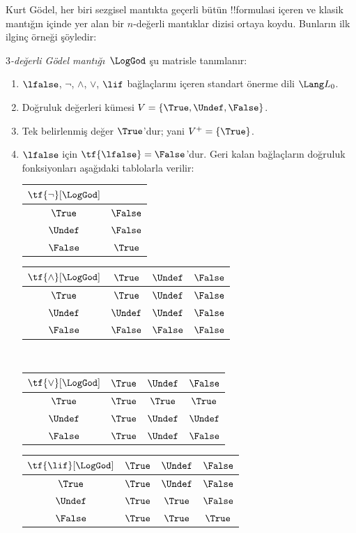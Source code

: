 



Kurt G\"odel, her biri sezgisel mantıkta geçerli bütün !!{formula}s{}i
içeren ve klasik mantığın içinde yer alan bir $n$-değerli mantıklar dizisi
ortaya koydu. Bunların ilk ilginç örneği şöyledir:

\begin{defn}
\emph{$3$-değerli G\"odel mantığı}~$\LogGod$ şu matrisle tanımlanır:
\begin{enumerate}
  \item $\lfalse$, $\lnot$, $\land$, $\lor$, $\lif$ bağlaçlarını içeren
  standart önerme dili $\Lang L_0$.
  \item Doğruluk değerleri kümesi $V = \{\True, \Undef, \False\}$.
  \item Tek belirlenmiş değer $\True$'dur; yani $V^+ = \{\True\}$.
  \item $\lfalse$ için $\tf{\lfalse} = \False$'dur. Geri kalan bağlaçların
  doğruluk fonksiyonları aşağıdaki tablolarla verilir:
  \begin{center}
    \begin{tabular}{c|c} 
      $\tf{\lnot}[\LogGod]$ & \\ 
      \hline  
      $\True$ & $\False$ \\ 
      $\Undef$ & $\False$ \\
      $\False$ & $\True$ 
    \end{tabular}
    \quad
    \begin{tabular}{c|ccc} 
      $\tf{\land}[\LogGod]$ & $\True$ & $\Undef$ & $\False$ \\ 
      \hline 
      $\True$ & $\True$ & $\Undef$ & $\False$ \\ 
      $\Undef$ & $\Undef$ & $\Undef$ & $\False$\\ 
      $\False$ & $\False$ & $\False$ & $\False$ 
    \end{tabular}
    \\[2ex]
    \begin{tabular}{c|ccc} 
      $\tf{\lor}[\LogGod]$ & $\True$ & $\Undef$ & $\False$ \\ 
      \hline 
      $\True$ & $\True$ & $\True$ & $\True$ \\ 
      $\Undef$ & $\True$ & $\Undef$ & $\Undef$ \\
      $\False$ & $\True$ & $\Undef$ & $\False$ 
    \end{tabular}
    \quad
    \begin{tabular}{c|ccc} 
      $\tf{\lif}[\LogGod]$ & $\True$ & $\Undef$ & $\False$ \\ 
      \hline 
      $\True$ & $\True$ & $\Undef$ & $\False$ \\ 
      $\Undef$ & $\True$ & $\True$ & $\False$  \\ 
      $\False$ & $\True$ & $\True$ & $\True$ 
    \end{tabular}
  \end{center} 
\end{enumerate}
\end{defn}

